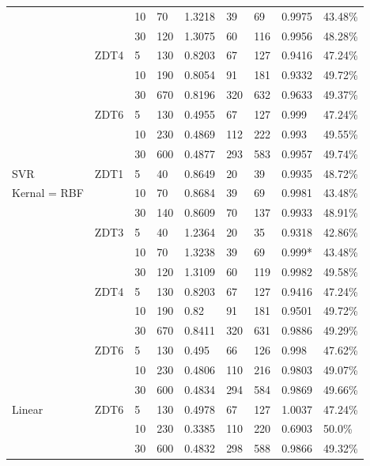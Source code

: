 \documentclass[sigconf,review,nonacm]{acmart}
\begin{document}
\begin{table}[b]
\begin{tabular}{l|llllll|l|l}
 & & 10 & 70 & 1.3218 & 39 & 69 & 0.9975 & 43.48\% \\
 & & 30 & 120 & 1.3075 & 60 & 116 & 0.9956 & 48.28\% \\
 & ZDT4 & 5 & 130 & 0.8203 & 67 & 127 & 0.9416 & 47.24\% \\
 & & 10 & 190 & 0.8054 & 91 & 181 & 0.9332 & 49.72\% \\
 & & 30 & 670 & 0.8196 & 320 & 632 & 0.9633 & 49.37\% \\
 & ZDT6 & 5 & 130 & 0.4955 & 67 & 127 & 0.999 & 47.24\% \\
 & & 10 & 230 & 0.4869 & 112 & 222 & 0.993 & 49.55\% \\
 & & 30 & 600 & 0.4877 & 293 & 583 & 0.9957 & 49.74\% \\ \hline
SVR & ZDT1 & 5 & 40 & 0.8649 & 20 & 39 & 0.9935 & 48.72\% \\ 
Kernal = RBF & & 10 & 70 & 0.8684 & 39 & 69 & 0.9981 & 43.48\% \\
 & & 30 & 140 & 0.8609 & 70 & 137 & 0.9933 & 48.91\% \\
 & ZDT3 & 5 & 40 & 1.2364 & 20 & 35 & 0.9318 & 42.86\% \\
 & & 10 & 70 & 1.3238 & 39 & 69 & 0.999* & 43.48\% \\
 & & 30 & 120 & 1.3109 & 60 & 119 & 0.9982 & 49.58\% \\
 & ZDT4 & 5 & 130 & 0.8203 & 67 & 127 & 0.9416 & 47.24\% \\
 & & 10 & 190 & 0.82 & 91 & 181 & 0.9501 & 49.72\% \\
 & & 30 & 670 & 0.8411 & 320 & 631 & 0.9886 & 49.29\% \\
 & ZDT6 & 5 & 130 & 0.495 & 66 & 126 & 0.998 & 47.62\% \\
 & & 10 & 230 & 0.4806 & 110 & 216 & 0.9803 & 49.07\% \\
 & & 30 & 600 & 0.4834 & 294 & 584 & 0.9869 & 49.66\% \\ \hline
Linear & ZDT6 & 5 & 130 & 0.4978 & 67 & 127 & 1.0037 & 47.24\% \\
 & & 10 & 230 & 0.3385 & 110 & 220 & 0.6903 & 50.0\% \\
 & & 30 & 600 & 0.4832 & 298 & 588 & 0.9866 & 49.32\% \\
\end{tabular} 
\end{table}
\end{document}
